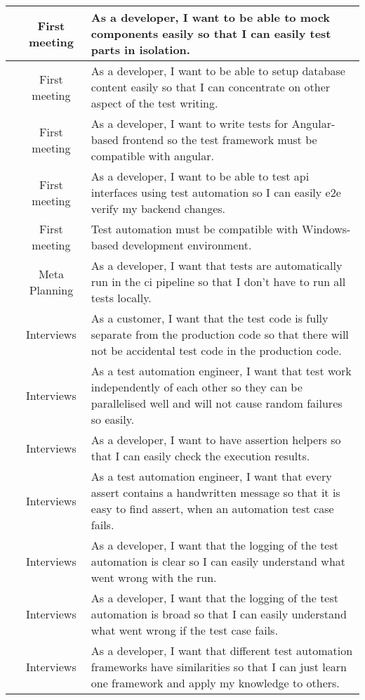 \begin{center}
\begin{xltabular}{\textwidth}{|c|c|X|}
		\hline
		\reid & First meeting & As a developer, I want to be able to mock components easily so that I can easily test parts in isolation. \\
		\hline
		\reid & First meeting & As a developer, I want to be able to setup database content easily so that I can concentrate on other aspect of the test writing. \\
		\hline
		\reid & First meeting & As a developer, I want to write tests for Angular-based frontend so the test framework must be compatible with angular.  \\
		\hline
		\reid & First meeting & As a developer, I want to be able to test \gls{api} interfaces using test automation so I can easily \gls{e2e} verify my backend changes. \\
		\hline
		\reid & First meeting & Test automation must be compatible with Windows-based development environment. \\
		\hline
		\reid & Meta Planning & As a developer, I want that tests are automatically run in the \gls{ci} pipeline so that I don't have to run all tests locally.\\
		\hline
		\reid & Interviews & As a customer, I want that the test code is fully separate from the production code so that there will not be accidental test code in the production code.\\
		\hline
		\reid & Interviews & As a test automation engineer, I want that test work independently of each other so they can be parallelised well and will not cause random failures so easily.\\
		\hline
		\reid & Interviews & As a developer, I want to have assertion helpers so that I can easily check the execution results.\\
		\hline
		\reid & Interviews & As a test automation engineer, I want that every assert contains a handwritten message so that it is easy to find assert, when an automation test case fails.\\
		\hline
		\reid & Interviews & As a developer, I want that the logging of the test automation is clear so I can easily understand what went wrong with the run.\\
		\hline
		\reid & Interviews & As a developer, I want that the logging of the test automation is broad so that I can easily understand what went wrong if the test case fails.\\
		\hline
		\reid & Interviews & As a developer, I want that different test automation frameworks have similarities so that I can just learn one framework and apply my knowledge to others.\\

\end{xltabular}
\end{center}
